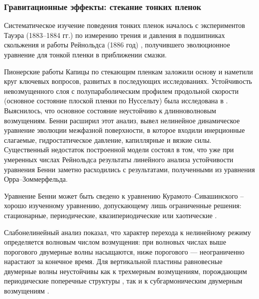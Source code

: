\documentclass[12pt,a4paper]{article}
\begin{document}

\subsubsection{Гравитационные эффекты: стекание тонких пленок}

Систематическое изучение поведения тонких пленок началось с экспериментов Тауэра (1883–1884 гг.) по измерению трения и давления в подшипниках скольжения и работы Рейнольдса (1886 год)  \cite{Reynolds1886}, получившего эволюционное уравнение для тонкой пленки в приближении смазки. 

Пионерские работы Капицы \cite{Kapitsa1948a, Kapitsa1948b, Kapitsa1949} по стекающим пленкам заложили основу и наметили круг ключевых вопросов, развитых в последующих исследованиях. Устойчивость невозмущенного слоя с полупараболическим профилем продольной скорости (основное состояние плоской пленки по Нуссельту) была исследована в \cite{Yih1955, Benjamin1957, Yih1963}. Выяснилось, что основное состояние неустойчиво к длинноволновым возмущениям. Бенни расширил \cite{Benney1966} этот анализ, вывел нелинейное динамическое уравнение эволюции межфазной поверхности, в которое входили инерционные слагаемые, гидростатическое давление, капиллярные и вязкие силы. Существенный недостаток построенной модели состоял в том, что уже при умеренных числах Рейнольдса результаты линейного анализа устойчивости уравнения Бенни заметно расходились с результатами, полученными из уравнения Орра--Зоммерфельда.

Уравнение Бенни может быть сведено к уравнению Курамото--Сивашинского \cite{Nepomniashchii1974, Kuramoto1975, Kuramoto1976, Sivashinsky1977} -- хорошо изученному уравнению, допускающему лишь ограниченные решения: стационарные, периодические, квазипериодические или хаотические \cite{Hyman1986, Kevrekidis1990}.

Слабонелинейный анализ \cite{Lin1969, Gjevik1970} показал, что характер перехода к нелинейному режиму определяется волновым числом возмущения: при волновых числах выше порогового двумерные волны насыщаются, ниже порогового — неограниченно нарастают за конечное время. Для вертикальной пластины равновесные двумерные волны неустойчивы как к трехмерным возмущениям, порождающим периодические поперечные структуры \cite{Joo1992a}, так и к субгармоническим двумерным возмущениям \cite{Joo1992b}.
\end{document}
